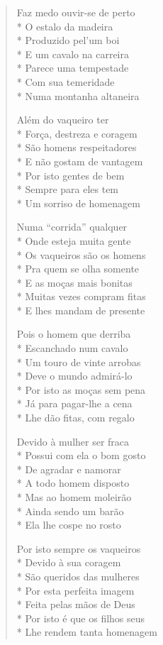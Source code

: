 \begin{verse}
Faz medo ouvir-se de perto\\*
O estalo da madeira\\*
Produzido pel'um boi\\*
E um cavalo na carreira\\*
Parece uma tempestade\\*
Com sua temeridade\\*
Numa montanha altaneira

Além do vaqueiro ter\\*
Força, destreza e coragem\\*
São homens respeitadores\\*
E não gostam de vantagem\\*
Por isto gentes de bem\\*
Sempre para eles tem\\*
Um sorriso de homenagem

Numa ``corrida'' qualquer\\*
Onde esteja muita gente\\*
Os vaqueiros são os homens\\*
Pra quem se olha somente\\*
E as moças mais bonitas\\*
Muitas vezes compram fitas\\*
E lhes mandam de presente

Pois o homem que derriba\\*
Escanchado num cavalo\\*
Um touro de vinte arrobas\\*
Deve o mundo admirá-lo\\*
Por isto as moças sem pena\\*
Já para pagar-lhe a cena\\*
Lhe dão fitas, com regalo

Devido à mulher ser fraca\\*
Possui com ela o bom gosto\\*
De agradar e namorar\\*
A todo homem disposto\\*
Mas ao homem moleirão\\*
Ainda sendo um barão\\*
Ela lhe cospe no rosto

Por isto sempre os vaqueiros\\*
Devido à sua coragem\\*
São queridos das mulheres\\*
Por esta perfeita imagem\\*
Feita pelas mãos de Deus\\*
Por isto é que os filhos seus\\*
Lhe rendem tanta homenagem


\end{verse}
